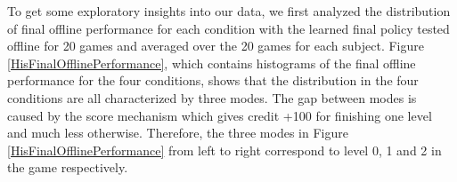 %
%
%
%

To get some exploratory insights into our data, we first analyzed the distribution of final offline performance for each condition with the learned final policy tested offline for 20 games and averaged over the 20 games for each subject. %
Figure \ref{HisFinalOfflinePerformance}, which contains histograms of the final offline performance for the four conditions, shows that the distribution in the four conditions are all characterized by three modes. The gap between modes is caused by the score mechanism which gives credit +100 for finishing one level and much less otherwise. Therefore, the three modes in Figure \ref{HisFinalOfflinePerformance} from left to right correspond to level 0, 1 and 2 in the game respectively.

